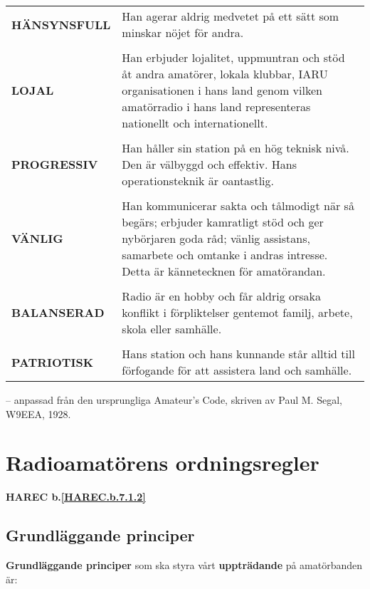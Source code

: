 \begin{tabular}{lp{9cm}}
  \textbf{HÄNSYNSFULL} &
     Han agerar aldrig medvetet på ett sätt som minskar nöjet för andra. \\
  & \\
  
  \textbf{LOJAL} &
     Han erbjuder lojalitet, uppmuntran och stöd åt andra amatörer, lokala klubbar, IARU organisationen i hans land genom vilken amatörradio i hans land representeras nationellt och internationellt.\\
  & \\

  \textbf{PROGRESSIV} &
Han håller sin station på en hög teknisk nivå. Den är välbyggd och effektiv. Hans operationsteknik är oantastlig.\\
  & \\

  \textbf{VÄNLIG} &
Han kommunicerar sakta och tålmodigt när så begärs; erbjuder kamratligt stöd och ger nybörjaren goda råd; vänlig assistans, samarbete och omtanke i andras intresse. Detta är kännetecknen för amatörandan.\\
  & \\

  \textbf{BALANSERAD} &
Radio är en hobby och får aldrig orsaka konflikt i förpliktelser gentemot familj, arbete, skola eller samhälle.\\
  & \\

  \textbf{PATRIOTISK} &
Hans station och hans kunnande står alltid till förfogande för att assistera land och samhälle.\\
\end{tabular}

-- anpassad från den ursprungliga Amateur's Code, skriven av Paul M. Segal, W9EEA, 1928.

\section{Radioamatörens ordningsregler}
\textbf{HAREC
  b.\ref{HAREC.b.7.1.2}\label{myHAREC.b.7.1.2}
}

\subsection{Grundläggande principer}
\textbf{Grundläggande principer} som ska styra vårt \textbf{uppträdande} på
amatörbanden är:

